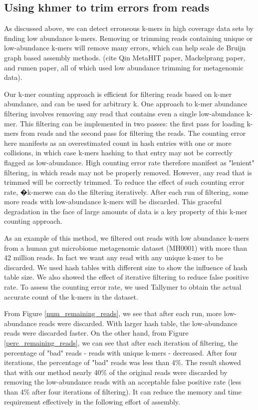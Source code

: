 \documentclass{article}
\begin{document}
\subsection{Using khmer to trim errors from reads}


As discussed above, we can detect erroneous k-mers in high coverage
data sets by finding low abundance k-mers.  Removing or trimming reads
containing unique or low-abundance k-mers will remove many errors,
which can help scale de Bruijn graph based assembly methods.
(cite Qin MetaHIT paper, Mackelprang paper, and rumen paper, all of
which used low abundance trimming for metagenomic data).

Our k-mer counting approach is efficient for filtering reads based on
k-mer abundance, and can be used for arbitrary k. One approach to
k-mer abundance filtering involves removing any read that contains
even a single low-abundance k-mer.
This filtering can be implemented
in two passes: the first pass for loading k-mers from reads and the
second pass for filtering the reads. The counting error here manifests
as an overestimated count in hash entries with one or more collisions,
in which case k-mers hashing to that entry may not be correctly
flagged as low-abundance.  High counting error rate therefore manifest
as "lenient" filtering, in which reads may not be properly
removed. However, any read that is trimmed will be correctly
trimmed. To reduce the effect of such counting error rate, �k-merwe can do
the filtering iteratively. After each run of filtering, some more
reads with low-abundance k-mers will be discarded. This graceful
degradation in the face of large amounts of data is a key property of
this k-mer counting approach.

As an example of this method, we filtered out reads with low abundance
k-mers from a human gut microbiome metagenomic dataset (MH0001) with
more than 42 million reads. In fact we want any read with any unique
k-mer to be discarded.  We used hash tables with different size to
show the influence of hash table size. We also showed the effect of
iterative filtering to reduce false positive rate. To assess the
counting error rate, we used Tallymer to obtain the actual accurate
count of the k-mers in the dataset.

From Figure \ref{num_remaining_reads}, we see that after each run,
more low-abundance reads were discarded. With larger hash table, the
low-abundance reads were discarded faster. On the other hand, from
Figure \ref{perc_remaining_reads}, we can see that after each
iteration of filtering, the percentage of "bad" reads - reads with
unique k-mers - decreased. After four iterations, the percentage of
"bad" reads was less than 4\%. The result showed that with our method
nearly 40\% of the original reads were discarded by removing the
low-abundance reads with an acceptable false positive rate (less than
4\% after four iterations of filtering). It can reduce the memory and
time requirement effectively in the following effort of assembly.
\end{document}
